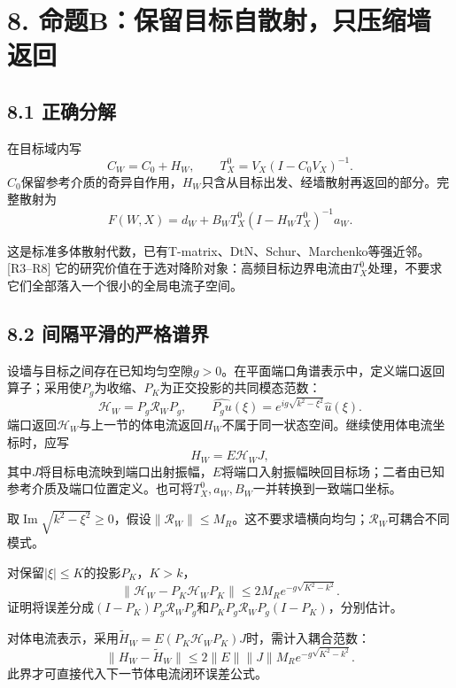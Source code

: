 \documentclass[
  10pt,
  a4paper,
]{article}
\begin{document}
\hypertarget{ux547dux9898bux4fddux7559ux76eeux6807ux81eaux6563ux5c04ux53eaux538bux7f29ux5899ux8fd4ux56de}{%
\section{8.
命题B：保留目标自散射，只压缩墙返回}\label{ux547dux9898bux4fddux7559ux76eeux6807ux81eaux6563ux5c04ux53eaux538bux7f29ux5899ux8fd4ux56de}}

\hypertarget{ux6b63ux786eux5206ux89e3}{%
\subsection{8.1 正确分解}\label{ux6b63ux786eux5206ux89e3}}

在目标域内写 \[
C_W=C_0+H_W,\qquad
T_X^0=V_X(I-C_0V_X)^{-1}.
\]
\(C_0\)保留参考介质的奇异自作用，\(H_W\)只含从目标出发、经墙散射再返回的部分。完整散射为
\[
\boxed{
F(W,X)=d_W+B_WT_X^0(I-H_WT_X^0)^{-1}a_W.
}
\]

这是标准多体散射代数，已有T-matrix、DtN、Schur、Marchenko等强近邻。{[}R3--R8{]}
它的研究价值在于选对降阶对象：高频目标边界电流由\(T_X^0\)处理，不要求它们全部落入一个很小的全局电流子空间。

\hypertarget{ux95f4ux9694ux5e73ux6ed1ux7684ux4e25ux683cux8c31ux754c}{%
\subsection{8.2
间隔平滑的严格谱界}\label{ux95f4ux9694ux5e73ux6ed1ux7684ux4e25ux683cux8c31ux754c}}

设墙与目标之间存在已知均匀空隙\(g>0\)。在平面端口角谱表示中，定义端口返回算子；采用使\(P_g\)为收缩、\(P_K\)为正交投影的共同模态范数：
\[
\mathcal H_W=P_g\mathcal R_WP_g,\qquad
\widehat{P_g u}(\xi)
=e^{ig\sqrt{k^2-\xi^2}}\hat u(\xi).
\]
端口返回\(\mathcal H_W\)与上一节的体电流返回\(H_W\)不属于同一状态空间。继续使用体电流坐标时，应写
\[
H_W=E\mathcal H_WJ,
\]
其中\(J\)将目标电流映到端口出射振幅，\(E\)将端口入射振幅映回目标场；二者由已知参考介质及端口位置定义。也可将\(T_X^0,a_W,B_W\)一并转换到一致端口坐标。

取\(\operatorname{Im}\sqrt{k^2-\xi^2}\ge0\)，假设\(\|\mathcal R_W\|\le M_R\)。这不要求墙横向均匀；\(\mathcal R_W\)可耦合不同模式。

对保留\(|\xi|\le K\)的投影\(P_K\)，\(K>k\)， \[
\boxed{
\|\mathcal H_W-P_K\mathcal H_WP_K\|
\le2M_R e^{-g\sqrt{K^2-k^2}}.
}
\]
证明将误差分成\((I-P_K)P_g\mathcal R_WP_g\)和\(P_KP_g\mathcal R_WP_g(I-P_K)\)，分别估计。

对体电流表示，采用\(\widetilde H_W=E(P_K\mathcal H_WP_K)J\)时，需计入耦合范数：
\[
\|H_W-\widetilde H_W\|
\le2\|E\|\|J\|M_R e^{-g\sqrt{K^2-k^2}}.
\] 此界才可直接代入下一节体电流闭环误差公式。
\end{document}
